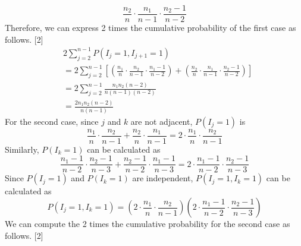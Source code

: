 \documentclass[a4paper,12pt]{article}
\begin{document}
\begin{equation*}
\frac { n_2 } { n } \cdot \frac { n_1 } { n - 1 } \cdot \frac { n_2 - 1 } { n - 2 }
\end{equation*}
Therefore, we can express 2 times the cumulative probability of the first case as follows. [2]
\begin{equation}\label{3.2.2.5}
\begin{aligned}
&2 \sum _ { j = 2 } ^ { n-1 } P \left( I _ { j } = 1 , I _ { j + 1 } = 1 \right)\\
&= 2  \sum _ { j = 2 } ^ { n-1 } \left[ \left( \frac { n_1 } { n } \cdot \frac { n_2 } { n - 1 } \cdot \frac { n_1 - 1 } { n - 2 } \right) + \left( \frac { n_2 } { n } \cdot \frac { n_1 } { n - 1 } \cdot \frac { n_2 - 1 } { n - 2 } \right) \right] \\  & =2  \sum _ { j = 2 } ^ { n-1 } \frac { n_1 n_2 ( n - 2 ) } { n  ( n - 1 ) ( n - 2 ) } \\
&=  \frac { 2 n_1 n_2 ( n - 2 ) } {  n  ( n - 1 ) }
\end{aligned}
\end{equation}
For the second case, since $j$ and $k$ are not adjacent, $P(I_j=1)$ is
\begin{equation*}
\frac { n_1 } { n } \cdot \frac { n_2 } { n - 1 }+\frac { n_2 } { n } \cdot \frac { n_1 } { n - 1 }=2 \cdot \frac { n_1 } { n } \cdot \frac { n_2 } { n - 1 }
\end{equation*}
Similarly, $P(I_k=1)$ can be calculated as
\begin{equation*}
 \frac { n_1 - 1 } { n - 2 } \cdot \frac { n_2 - 1 } { n - 3 }+ \frac { n_2 - 1 } { n - 2 } \cdot \frac { n_1 - 1 } { n - 3 }=2 \cdot \frac { n_1 - 1 } { n - 2 } \cdot \frac { n_2 - 1 } { n - 3 }
\end{equation*}
Since $P(I_j=1)$ and $P(I_k=1)$ are independent, $P \left( I _ { j } = 1 , I _ { k } = 1 \right)$ can be calculated as
\begin{equation*}
P ( I _ { j } = 1 , I _ { k } = 1 )=( 2 \cdot \frac { n_1 } { n } \cdot \frac { n_2 } { n - 1 } ) ( 2 \cdot \frac { n_1 - 1 } { n - 2 } \cdot \frac { n_2 - 1 } { n - 3 })
\end{equation*}
We can compute the 2 times the cumulative probability for the second case as follows. [2]\\
\end{document}
